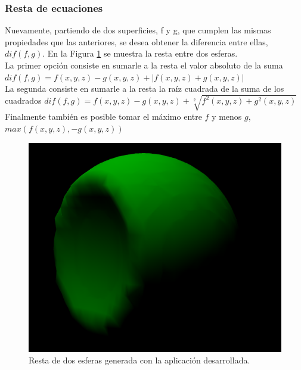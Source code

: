 \documentclass[12pt]{article}
\begin{document}
\subsubsection{Resta de ecuaciones}
Nuevamente, partiendo de dos superficies, f y g, que cumplen las mismas propiedades que las anteriores, se desea obtener la diferencia entre ellas, $dif(f,g)$. En la Figura \ref{resta} se muestra la resta entre dos esferas.
\\La primer opción consiste en sumarle a la resta el valor absoluto de la suma $dif(f,g) = f(x,y,z) - g(x,y,z) + |f(x,y,z) + g(x,y,z)|$
\\La segunda consiste en sumarle a la resta la raíz cuadrada de la suma de los cuadrados $dif(f,g) = f(x,y,z) - g(x,y,z) + \sqrt[2]{f^2(x,y,z) + g^2(x,y,z)}$ 
\\Finalmente también es posible tomar el máximo entre $f$ y menos $g$, $max(f(x,y,z),-g(x,y,z))$
\begin{figure}[h]
\includegraphics[width=0.7\linewidth,center]{oi3.png}
\caption{Resta de dos esferas generada con la aplicación desarrollada.}
\label{resta}
\end{figure}
\clearpage
\end{document}
